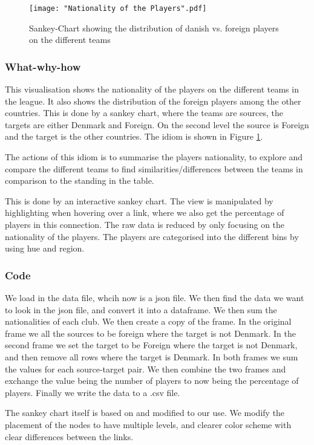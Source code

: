 \documentclass[Report.tex]{subfiles}
\begin{document}
\begin{figure}
\center
\texttt{[image: "Nationality of the Players".pdf]}
\caption{Sankey-Chart showing the distribution of danish vs. foreign players on the different teams}
\label{Fig:Nationality}
\end{figure}


\subsubsection{What-why-how}
This visualisation shows the nationality of the players on the different teams in the league. It also shows the distribution of the foreign players among the other countries. This is done by a sankey chart, where the teams are sources, the targets are either Denmark and Foreign. On the second level the source is Foreign and the target is the other countries. The idiom is shown in Figure \ref{Fig:Nationality}.

The actions of this idiom is to summarise the players nationality, to explore and compare the different teams to find similarities/differences between the teams in comparison to the standing in the table. 

This is done by an interactive sankey chart. The view is manipulated by highlighting when hovering over a link, where we also get the percentage of players in this connection. The raw data is reduced by only focusing on the nationality of the players. The players are categorised into the different bins by using hue and region.

\subsubsection{Code}
We load in the data file, whcih now is a json file. We then find the data we want to look in the json file, and convert it into a dataframe. We then sum the nationalities of each club. We then create a copy of the frame. In the original frame we all the sources to be foreign where the target is not Denmark. In the second frame we set the target to be Foreign where the target is not Denmark, and then remove all rows where the target is Denmark. In both frames we sum the values for each source-target pair. We then combine the two frames and exchange the value being the number of players to now being the percentage of players. Finally we write the data to a .csv file.

The sankey chart itself is based on \cite{Sankey} and modified to our use. We modify the placement of the nodes to have multiple levels, and clearer color scheme with clear differences between the links.
\end{document}
